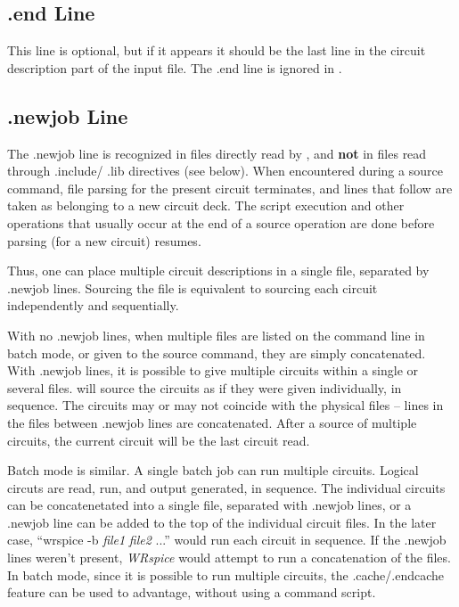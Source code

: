 \subsection{{\vt .end} Line}

This line is optional, but if it appears it should be the last line in
the circuit description part of the input file.  The {\vt .end} line
is ignored in {\WRspice}.

\subsection{{\vt .newjob} Line}

The {\vt .newjob} line is recognized in files directly read by
{\WRspice}, and {\bf not} in files read through {\vt .include}/{\vt
.lib} directives (see below).  When encountered during a {\cb source}
command, file parsing for the present circuit terminates, and lines
that follow are taken as belonging to a new circuit deck.  The script
execution and other operations that usually occur at the end of a {\cb
source} operation are done before parsing (for a new circuit) resumes.

Thus, one can place multiple circuit descriptions in a single file,
separated by {\vt .newjob} lines.  Sourcing the file is equivalent to
sourcing each circuit independently and sequentially.

With no {\vt .newjob} lines, when multiple files are listed on the
command line in batch mode, or given to the {\cb source} command, they
are simply concatenated.  With {\vt .newjob} lines, it is possible to
give multiple circuits within a single or several files.  {\WRspice}
will source the circuits as if they were given individually, in
sequence.  The circuits may or may not coincide with the physical
files -- lines in the files between {\vt .newjob} lines are
concatenated.  After a {\cb source} of multiple circuits, the current
circuit will be the last circuit read.

Batch mode is similar.  A single batch job can run multiple circuits. 
Logical circuts are read, run, and output generated, in sequence.  The
individual circuits can be concatenetated into a single file,
separated with {\vt .newjob} lines, or a {\vt .newjob} line can be
added to the top of the individual circuit files.  In the later case,
``{\vt wrspice -b} {\it file1} {\it file2} ...'' would run each
circuit in sequence.  If the {\vt .newjob} lines weren't present, {\it
WRspice} would attempt to run a concatenation of the files.  In batch
mode, since it is possible to run multiple circuits, the {\vt
.cache}/{\vt .endcache} feature can be used to advantage, without
using a command script.


